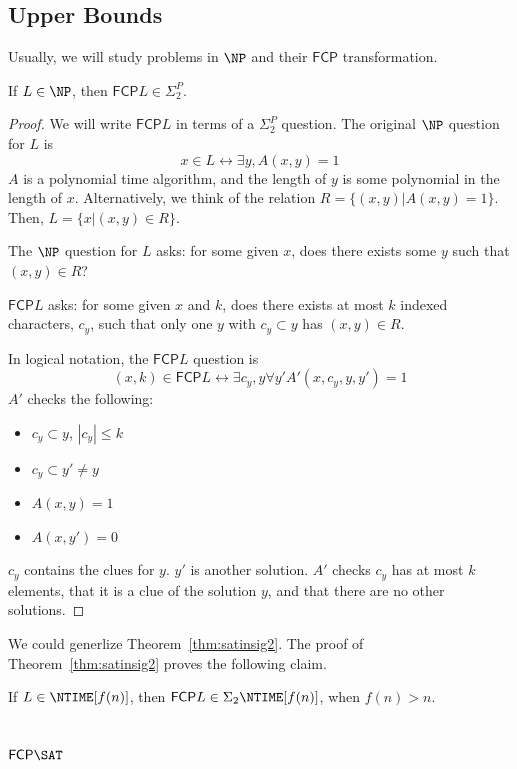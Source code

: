 \documentclass[runningheads,a4paper]{llncs}
\begin{document}
\subsection{Upper Bounds}

Usually, we will study problems in $\NP$ and their $\mathsf{FCP}$ transformation.

\begin{theorem}
\label{thm:satinsig2}
If $L \in \NP$, then $\mathsf{FCP} L \in \Sigma_2^P$. 
\end{theorem}

\begin{proof}
We will write $\mathsf{FCP} L$ in terms of a $\Sigma_2^P$ question. The original $\NP$ question for $L$ is
\[ x \in L \leftrightarrow \exists y, A(x, y) = 1 \]
$A$ is a polynomial time algorithm, and the length of $y$ is some polynomial in the length of $x$. Alternatively, we think of the relation $R = \{ (x, y) | A(x,y) = 1 \}$. Then, $L = \{ x | (x,y) \in R \}$. 

The $\NP$ question for $L$ asks: for some given $x$, does there exists some $y$ such that $(x, y) \in R$?

$\mathsf{FCP} L$ asks: for some given $x$ and $k$, does there exists at most $k$ indexed characters, $c_y$, such that only one $y$ with $c_y \subset y$ has $(x,y) \in R$. 

In logical notation, the $\mathsf{FCP} L$ question is
\[ (x, k) \in \mathsf{FCP} L \leftrightarrow \exists c_y, y \forall y' A'(x, c_y, y, y') = 1 \]
$A'$ checks the following:
\begin{itemize}
\item $c_y \subset y$, $|c_y| \leq k$
\item $c_y \subset y' \neq y$ 
\item $A(x,y) = 1$
\item $A(x, y') = 0$ 
\end{itemize}
$c_y$ contains the clues for $y$. $y'$ is another solution. $A'$ checks $c_y$ has at most $k$ elements, that it is a clue of the solution $y$, and that there are no other solutions.
\end{proof}

We could generlize Theorem~\ref{thm:satinsig2}. The proof of Theorem~\ref{thm:satinsig2} proves the following claim.
\begin{claim} If $L \in \NTIME[f(n)]$, then $\mathsf{FCP} L \in \Sigma_2 \NTIME[f(n)]$, when $f(n) > n$.
\end{claim}

\subsection{$\mathsf{FCP} \SAT$}
\end{document}
